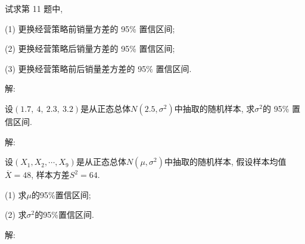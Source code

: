 \documentclass[standard]{ExBook}
\begin{document}
\begin{qitems}
\vspace{-5em}

    \begin{bbox}
    \begin{shaded}
        \qitem
试求第 11 题中,

(1) 更换经营策略前销量方差的 95\% 置信区间;

(2) 更换经营策略后销量方差的 95\% 置信区间;

(3) 更换经营策略前后销量差方差的 95\% 置信区间.
    \end{shaded}
    \end{bbox}

\vspace{-5em}

    \begin{bbox}
解: 
    \end{bbox}

\vspace{-5em}

    \begin{bbox}
    \begin{shaded}
        \qitem
设$(1.7,\ 4,\ 2.3,\ 3.2)$是从正态总体$N(2.5,\sigma^2)$中抽取的随机样本, 求$\sigma^2$的 95\% 置信区间.
    \end{shaded}
    \end{bbox}

\vspace{-5em}

    \begin{bbox}
解: 
    \end{bbox}

\vspace{-5em}

    \begin{bbox}
    \begin{shaded}
        \qitem
设$(X_1,X_2,\cdots,X_9)$是从正态总体$N(\mu,\sigma^2)$中抽取的随机样本, 假设样本均值$\overline{X}=48$, 样本方差$S^2=64$.

(1) 求$\mu$的95\%置信区间;

(2) 求$\sigma^2$的95\%置信区间.
    \end{shaded}
    \end{bbox}

\vspace{-5em}

    \begin{bbox}
解: 
    \end{bbox}

\vspace{-5em}


\end{qitems}
\end{document}
